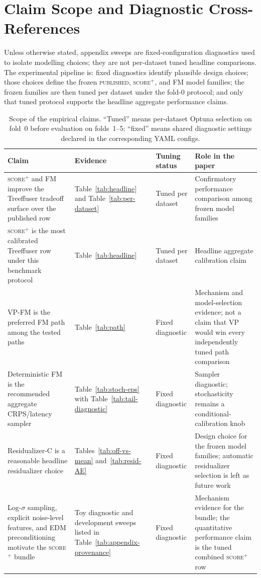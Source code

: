 \documentclass{tpm2026}
\begin{document}
\section{Claim Scope and Diagnostic Cross-References}\label{app:score-side}

Unless otherwise stated, appendix sweeps are fixed-configuration diagnostics used to isolate modelling choices; they are not per-dataset tuned headline comparisons. The experimental pipeline is: fixed diagnostics identify plausible design choices; those choices define the frozen \textsc{published}, \textsc{score$^+$}, and \textsc{FM} model families; the frozen families are then tuned per dataset under the fold-0 protocol; and only that tuned protocol supports the headline aggregate performance claims.

\begin{table}[!h]
  \centering
  \caption{Scope of the empirical claims. ``Tuned'' means per-dataset Optuna selection on fold~0 before evaluation on folds~1--5; ``fixed'' means shared diagnostic settings declared in the corresponding YAML configs.}\label{tab:claim-map}
  \scriptsize
  \begin{tabular}{@{}p{}p{}p{}p{}@{}}
    \toprule
    Claim & Evidence & Tuning status & Role in the paper \\
    \midrule
    \textsc{score$^+$} and \textsc{FM} improve the Treeffuser tradeoff surface over the published row & Table~\ref{tab:headline} and Table~\ref{tab:per-dataset} & Tuned per dataset & Confirmatory performance comparison among frozen model families \\
    \textsc{score$^+$} is the most calibrated Treeffuser row under this benchmark protocol & Table~\ref{tab:headline} & Tuned per dataset & Headline aggregate calibration claim \\
    VP-FM is the preferred FM path among the tested paths & Table~\ref{tab:path} & Fixed diagnostic & Mechanism and model-selection evidence; not a claim that VP would win every independently tuned path comparison \\
    Deterministic FM is the recommended aggregate CRPS/latency sampler & Table~\ref{tab:stoch-eps} with Table~\ref{tab:tail-diagnostic} & Fixed diagnostic & Sampler diagnostic; stochasticity remains a conditional-calibration knob \\
    Residualizer-C is a reasonable headline residualizer choice & Tables~\ref{tab:off-vs-mean} and~\ref{tab:resid-AE} & Fixed diagnostic & Design choice for the frozen model families; automatic residualizer selection is left as future work \\
    Log-$\sigma$ sampling, explicit noise-level features, and EDM preconditioning motivate the \textsc{score$^+$} bundle & Toy diagnostic and development sweeps listed in Table~\ref{tab:appendix-provenance} & Fixed diagnostic & Mechanism evidence for the bundle; the quantitative performance claim is the tuned combined \textsc{score$^+$} row \\
    \bottomrule
  \end{tabular}
\end{table}
\end{document}
